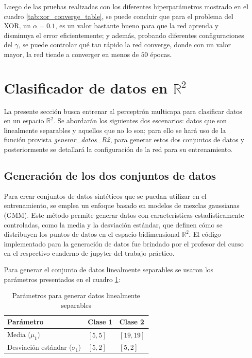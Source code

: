 \documentclass{article}
\begin{document}
Luego de las pruebas realizadas con los diferentes hiperparámetros mostrado en el cuadro \ref{tab:xor_converge_table}, se puede concluir que para el problema del XOR, un $\alpha=0.1$, es un valor bastante bueno para que la red aprenda y disminuya el error eficientemente; y además, probando diferentes configuraciones del $\gamma$, se puede controlar qué tan rápido la red converge, donde con un valor mayor, la red tiende a converger en menos de $50$ épocas. 


\newpage
\section{Clasificador de datos en $\mathbb{R}^2$}

La presente sección busca entrenar al perceptrón multicapa para clasificar datos en un espacio $\mathbb{R}^2$. Se abordarán los siguientes dos escenarios: datos que son linealmente separables y aquellos que no lo son; para ello se hará uso de la función provista \textit{generar\_datos\_R2},  para generar estos dos conjuntos de datos y posteriormente se detallará la configuración de la red para su entrenamiento.

\subsection{Generación de los dos conjuntos de datos}

Para crear conjuntos de datos sintéticos que se puedan utilizar en el entrenamiento, se emplea un enfoque basado en modelos de mezclas gaussianas (GMM). Este método permite generar datos con características estadísticamente controladas, como la media y la desviación estándar, que definen cómo se distribuyen los puntos de datos en el espacio bidimensional $\mathbb{R}^{2}$. El código implementado para la generación de datos fue brindado por el profesor del curso en el respectivo cuaderno de jupyter del trabajo práctico. 
\medskip

Para generar el conjunto de datos linealmente separables se usaron los parámetros presentados en el cuadro \ref{tab:linear_params}:
\begin{table}[h!]
    \centering
    \begin{tabular}{@{}lll@{}}
    \toprule
    Parámetro & Clase 1 & Clase 2 \\ \midrule
    Media ($\mu_1$) & $[5, 5]$ & $[19, 19]$ \\
    Desviación estándar ($\sigma_1$) & $[5, 2]$ & $[5, 2]$ \\ \bottomrule
    \end{tabular}
    \caption{Parámetros para generar datos linealmente separables}
    \label{tab:linear_params}
\end{table}
\end{document}
